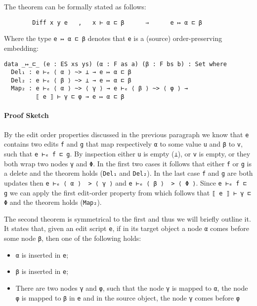 \documentclass[preprint]{sigplanconf}
\begin{document}
    The theorem can be formally stated as follows:
\begin{verbatim}
        Diff x y e   ,   x ⊢ α ⊏ β      ⇒      e ↦ α ⊏ β
\end{verbatim}

    Where the type \texttt{e ↦ α ⊏ β} denotes that \texttt{e} is a (source) 
    order-preserving embedding:
\begin{verbatim}
data _↦_⊏_ (e : ES xs ys) (α : F as a) (β : F bs b) : Set where
  Del₁ : e ⊢ₑ ⟨ α ⟩ ~> ⊥ → e ↦ α ⊏ β
  Del₂ : e ⊢ₑ ⟨ β ⟩ ~> ⊥ → e ↦ α ⊏ β
  Map₂ : e ⊢ₑ ⟨ α ⟩ ~> ⟨ γ ⟩ → e ⊢ₑ ⟨ β ⟩ ~> ⟨ φ ⟩ → 
         ⟦ e ⟧ ⊢ γ ⊏ φ → e ↦ α ⊏ β
\end{verbatim}

    \paragraph{Proof Sketch} By the edit order properties discussed in the previous
    paragraph we know that \texttt{e} contains two edits \texttt{f} and \texttt{g}
    that map respectively \texttt{α} to some value \texttt{u} and \texttt{β} to
    \texttt{v}, such that \texttt{e ⊢ₑ f ⊏ g}. 
    By inspection either \texttt{u} is empty (\texttt{⊥}), or \texttt{v}
    is empty, or they both wrap two nodes \texttt{γ} and \texttt{Φ}.
    In the first two cases it follows that either \texttt{f} or \texttt{g} is
    a delete and the theorem holds (\texttt{Del₁} and \texttt{Del₂}).
    In the last case \texttt{f} and \texttt{g} are both updates then 
    \texttt{e ⊢ₑ ⟨ α ⟩ ~> ⟨ γ ⟩} and \texttt{e ⊢ₑ ⟨ β ⟩ ~> ⟨ Φ ⟩}.
    Since \texttt{e ⊢ₑ f ⊏ g} we can apply the first edit-order property from
    which follows that \texttt{⟦ e ⟧ ⊢ γ ⊏ Φ} and the theorem holds (\texttt{Map₂}).

    The second theorem is symmetrical to the first and thus we will 
    briefly outline it.
    It states that, given an edit script \texttt{e}, if in its
    target object a node \texttt{α} comes before
    some node \texttt{β}, then one of the following holds:
    \begin{itemize}
            \item \texttt{α} is inserted in \texttt{e};
            \item \texttt{β} is inserted in \texttt{e};
            \item There are two nodes \texttt{γ} and \texttt{φ}, such that the node 
            \texttt{γ} is mapped to \texttt{α}, the node \texttt{φ} is mapped to 
            \texttt{β} in 	\texttt{e} and in the source object, 
            the node \texttt{γ} comes before \texttt{φ}
    \end{itemize}
\end{document}

